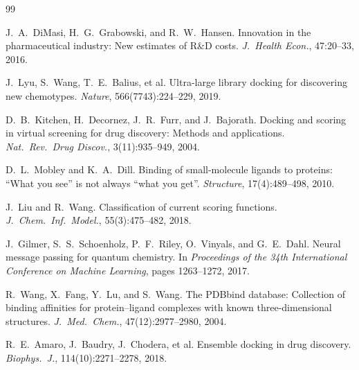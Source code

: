 \begin{thebibliography}{99}

J.\ A.\ DiMasi, H.\ G.\ Grabowski, and R.\ W.\ Hansen.
\newblock Innovation in the pharmaceutical industry: New estimates of R\&D costs.
\newblock \textit{J.\ Health Econ.}, 47:20--33, 2016.

J.\ Lyu, S.\ Wang, T.\ E.\ Balius, et al.
\newblock Ultra-large library docking for discovering new chemotypes.
\newblock \textit{Nature}, 566(7743):224--229, 2019.

D.\ B.\ Kitchen, H.\ Decornez, J.\ R.\ Furr, and J.\ Bajorath.
\newblock Docking and scoring in virtual screening for drug discovery: Methods and applications.
\newblock \textit{Nat.\ Rev.\ Drug Discov.}, 3(11):935--949, 2004.

D.\ L.\ Mobley and K.\ A.\ Dill.
\newblock Binding of small-molecule ligands to proteins: ``What you see'' is not always ``what you get''.
\newblock \textit{Structure}, 17(4):489--498, 2010.

J.\ Liu and R.\ Wang.
\newblock Classification of current scoring functions.
\newblock \textit{J.\ Chem.\ Inf.\ Model.}, 55(3):475--482, 2018.

J.\ Gilmer, S.\ S.\ Schoenholz, P.\ F.\ Riley, O.\ Vinyals, and G.\ E.\ Dahl.
\newblock Neural message passing for quantum chemistry.
\newblock In \textit{Proceedings of the 34th International Conference on Machine Learning}, pages 1263--1272, 2017.

R.\ Wang, X.\ Fang, Y.\ Lu, and S.\ Wang.
\newblock The PDBbind database: Collection of binding affinities for protein--ligand complexes with known three-dimensional structures.
\newblock \textit{J.\ Med.\ Chem.}, 47(12):2977--2980, 2004.

R.\ E.\ Amaro, J.\ Baudry, J.\ Chodera, et al.
\newblock Ensemble docking in drug discovery.
\newblock \textit{Biophys.\ J.}, 114(10):2271--2278, 2018.

\end{thebibliography}
